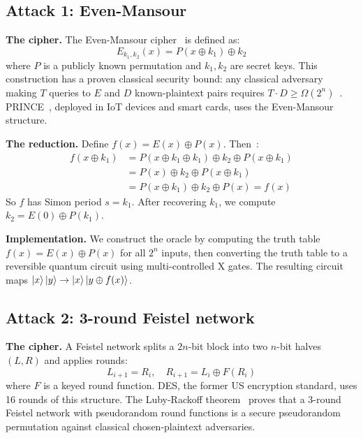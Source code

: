 \documentclass[11pt]{article}
\begin{document}
\subsection{Attack 1: Even-Mansour}

\textbf{The cipher.} The Even-Mansour cipher~\cite{even1997} is defined as:
\begin{equation}
    E_{k_1,k_2}(x) = P(x \oplus k_1) \oplus k_2
\end{equation}
where $P$ is a publicly known permutation and $k_1, k_2$ are secret keys. This construction has a proven classical security bound: any classical adversary making $T$ queries to $E$ and $D$ known-plaintext pairs requires $T \cdot D \geq \Omega(2^n)$~\cite{dunkelman2012}. PRINCE~\cite{borghoff2012}, deployed in IoT devices and smart cards, uses the Even-Mansour structure.

\textbf{The reduction.} Define $f(x) = E(x) \oplus P(x)$. Then~\cite{kuwakado2012}:
\begin{align}
    f(x \oplus k_1) &= P(x \oplus k_1 \oplus k_1) \oplus k_2 \oplus P(x \oplus k_1) \nonumber \\
    &= P(x) \oplus k_2 \oplus P(x \oplus k_1) \nonumber \\
    &= P(x \oplus k_1) \oplus k_2 \oplus P(x) = f(x)
\end{align}
So $f$ has Simon period $s = k_1$. After recovering $k_1$, we compute $k_2 = E(0) \oplus P(k_1)$.

\textbf{Implementation.} We construct the oracle by computing the truth table $f(x) = E(x) \oplus P(x)$ for all $2^n$ inputs, then converting the truth table to a reversible quantum circuit using multi-controlled X gates. The resulting circuit maps $\ket{x}\ket{y} \to \ket{x}\ket{y \oplus f(x)}$.

\subsection{Attack 2: 3-round Feistel network}

\textbf{The cipher.} A Feistel network splits a $2n$-bit block into two $n$-bit halves $(L, R)$ and applies rounds:
\begin{equation}
    L_{i+1} = R_i, \quad R_{i+1} = L_i \oplus F(R_i)
\end{equation}
where $F$ is a keyed round function. DES, the former US encryption standard, uses 16 rounds of this structure. The Luby-Rackoff theorem~\cite{luby1988} proves that a 3-round Feistel network with pseudorandom round functions is a secure pseudorandom permutation against classical chosen-plaintext adversaries.
\end{document}
